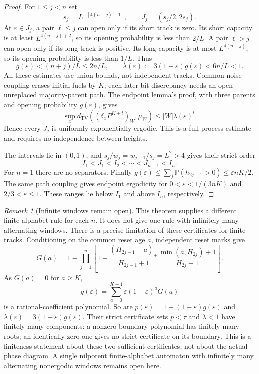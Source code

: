 \documentclass[11pt]{article}
\theoremstyle{plain}
\theoremstyle{definition}
\theoremstyle{remark}
\newtheorem{remark}[theorem]{Remark}
\newcommand{\Prob}{\mathbb P}
\newcommand{\eps}{\varepsilon}
\newcommand{\dtv}{d_{\mathrm{TV}}}
\begin{document}
\begin{proof}
For $1\le j<n$ set
\[
 s_j=L^{-[4(n-j)+1]},\qquad J_j=(s_j/2,2s_j).
\]
At $\eps\in J_j$, a pair $\ell\le j$ can open only if its short track is zero. Its short capacity is at least $L^{4(n-j)+2}$, so its opening probability is less than $2/L$. A pair $\ell>j$ can open only if its long track is positive. Its long capacity is at most $L^{4(n-j)}$, so its opening probability is less than $1/L$. Thus
\[
 g(\eps)<(n+j)/L\le2n/L,\qquad
 \lambda(\eps):=3(1-\eps)g(\eps)<6n/L<1 .
\]
All these estimates use union bounds, not independent tracks. Common-noise coupling erases initial fuels by $K$; each later bit discrepancy needs an open unreplaced majority-parent path. The endpoint lemma's proof, with three parents and opening probability $g(\eps)$, gives
\[
 \sup_x\dtv((\delta_xP^{K+t})_W,\mu_W)
 \le |W|\lambda(\eps)^t.
\]
Hence every $J_j$ is uniformly exponentially ergodic. This is a full-process estimate and requires no independence between heights.

The intervals lie in $(0,1)$, and $s_j/w_j=w_{j+1}/s_j=L^2>4$ gives their strict order
\[
 I_1<J_1<I_2<\cdots<J_{n-1}<I_n .
\]
For $n=1$ there are no separators. Finally $g(\eps)\le\sum_j\Prob(h_{2j-1}>0)\le\eps nK/2$. The same path coupling gives endpoint ergodicity for $0<\eps<1/(3nK)$ and $2/3<\eps\le1$. These ranges lie below $I_1$ and above $I_n$, respectively.
\end{proof}

\begin{remark}[Infinite windows remain open]\label{rem:nu-infinite}
This theorem supplies a different finite-alphabet rule for each $n$. It does not give one rule with infinitely many alternating windows. There is a precise limitation of these certificates for finite tracks. Conditioning on the common reset age $a$, independent reset marks give
\[
 G(a)=1-\prod_{j=1}^n\left[
 1-\frac{(H_{2j-1}-a)_+}{H_{2j-1}+1}
       \frac{\min(a,H_{2j})+1}{H_{2j}+1}
 \right].
\]
As $G(a)=0$ for $a\ge K$,
\[
 g(\eps)=\sum_{a=0}^{K-1}\eps(1-\eps)^aG(a)
\]
is a rational-coefficient polynomial. So are $p(\eps)=1-(1-\eps)g(\eps)$ and $\lambda(\eps)=3(1-\eps)g(\eps)$. Their strict certificate sets $p<\tau$ and $\lambda<1$ have finitely many components: a nonzero boundary polynomial has finitely many roots; an identically zero one gives no strict certificate on its boundary. This is a finiteness statement about these two sufficient certificates, not about the actual phase diagram. A single nilpotent finite-alphabet automaton with infinitely many alternating nonergodic windows remains open here.
\end{remark}
\end{document}
